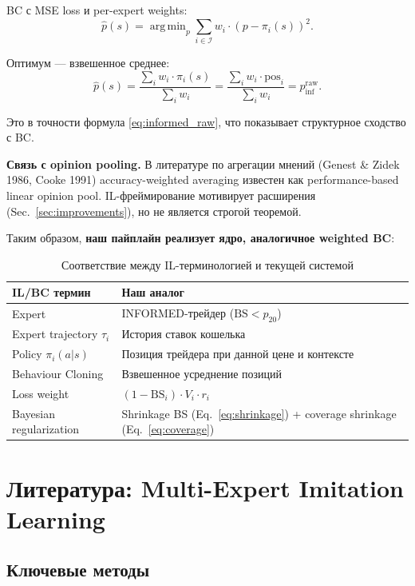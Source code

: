 \documentclass[a4paper, 11pt]{article}
\newcommand{\bs}{\mathrm{BS}}
\DeclareMathOperator*{\argmin}{arg\,min}
\begin{document}
BC с MSE loss и per-expert weights:
\[
\hat{p}(s) = \argmin_{p} \sum_{i \in \mathcal{I}} w_i \cdot (p - \pi_i(s))^2.
\]

Оптимум --- взвешенное среднее:
\[
\hat{p}(s) = \frac{\sum_{i} w_i \cdot \pi_i(s)}{\sum_{i} w_i}
= \frac{\sum_{i} w_i \cdot \mathrm{pos}_i}{\sum_{i} w_i}
= p_{\mathrm{inf}}^{\mathrm{raw}}.
\]

Это в точности формула \eqref{eq:informed_raw}, что показывает структурное
сходство с BC.

\textbf{Связь с opinion pooling.}
В литературе по агрегации мнений (Genest \& Zidek 1986, Cooke 1991)
accuracy-weighted averaging известен как performance-based linear opinion pool.
IL-фреймирование мотивирует расширения (Sec.~\ref{sec:improvements}),
но не является строгой теоремой.

Таким образом, \textbf{наш пайплайн реализует ядро, аналогичное weighted BC}:

\begin{table}[h]
\centering
\begin{tabular}{ll}
\toprule
\textbf{IL/BC термин} & \textbf{Наш аналог} \\
\midrule
Expert                        & INFORMED-трейдер ($\bs < p_{20}$) \\
Expert trajectory $\tau_i$    & История ставок кошелька \\
Policy $\pi_i(a|s)$           & Позиция трейдера при данной цене и контексте \\
Behaviour Cloning             & Взвешенное усреднение позиций \\
Loss weight                   & $(1 - \bs_i) \cdot V_i \cdot r_i$ \\
Bayesian regularization       & Shrinkage BS (Eq.~\ref{eq:shrinkage}) + coverage shrinkage (Eq.~\ref{eq:coverage}) \\
\bottomrule
\end{tabular}
\caption{Соответствие между IL-терминологией и текущей системой}
\label{tab:mapping}
\end{table}

\section{Литература: Multi-Expert Imitation Learning}
\label{sec:literature}

\subsection{Ключевые методы}
\end{document}
